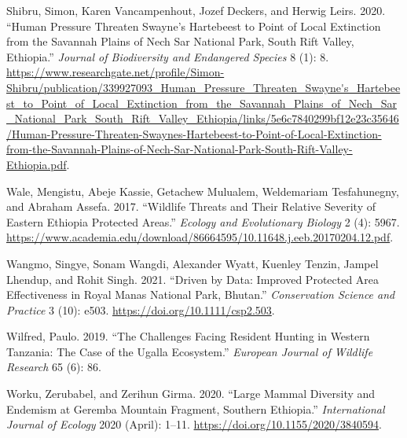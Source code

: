 \documentclass[
  letterpaper,
  DIV=11,
  numbers=noendperiod]{scrartcl}
\newlength{\cslhangindent}
\newenvironment{CSLReferences}[2] %
 {\begin{list}{}{%
  \setlength{\itemindent}{0pt}
  \setlength{\leftmargin}{0pt}
  \setlength{\parsep}{0pt}
  \ifodd #1
   \setlength{\leftmargin}{\cslhangindent}
   \setlength{\itemindent}{-1\cslhangindent}
  \fi
  \setlength{\itemsep}{#2\baselineskip}}}
 {\end{list}}
\begin{document}
\begin{CSLReferences}{1}{0}
Shibru, Simon, Karen Vancampenhout, Jozef Deckers, and Herwig Leirs.
2020. {``Human Pressure Threaten Swayne{'}s Hartebeest to Point of Local
Extinction from the Savannah Plains of Nech Sar National Park, South
Rift Valley, Ethiopia.''} \emph{Journal of Biodiversity and Endangered
Species} 8 (1): 8.
\url{https://www.researchgate.net/profile/Simon-Shibru/publication/339927093_Human_Pressure_Threaten_Swayne's_Hartebeest_to_Point_of_Local_Extinction_from_the_Savannah_Plains_of_Nech_Sar_National_Park_South_Rift_Valley_Ethiopia/links/5e6c7840299bf12e23c35646/Human-Pressure-Threaten-Swaynes-Hartebeest-to-Point-of-Local-Extinction-from-the-Savannah-Plains-of-Nech-Sar-National-Park-South-Rift-Valley-Ethiopia.pdf}.

Wale, Mengistu, Abeje Kassie, Getachew Mulualem, Weldemariam
Tesfahunegny, and Abraham Assefa. 2017. {``Wildlife Threats and Their
Relative Severity of Eastern Ethiopia Protected Areas.''} \emph{Ecology
and Evolutionary Biology} 2 (4): 5967.
\url{https://www.academia.edu/download/86664595/10.11648.j.eeb.20170204.12.pdf}.

Wangmo, Singye, Sonam Wangdi, Alexander Wyatt, Kuenley Tenzin, Jampel
Lhendup, and Rohit Singh. 2021. {``Driven by Data: Improved Protected
Area Effectiveness in Royal Manas National Park, Bhutan.''}
\emph{Conservation Science and Practice} 3 (10): e503.
\url{https://doi.org/10.1111/csp2.503}.

Wilfred, Paulo. 2019. {``The Challenges Facing Resident Hunting in
Western Tanzania: The Case of the Ugalla Ecosystem.''} \emph{European
Journal of Wildlife Research} 65 (6): 86.

Worku, Zerubabel, and Zerihun Girma. 2020. {``Large Mammal Diversity and
Endemism at Geremba Mountain Fragment, Southern Ethiopia.''}
\emph{International Journal of Ecology} 2020 (April): 1--11.
\url{https://doi.org/10.1155/2020/3840594}.

\end{CSLReferences}
\end{document}
